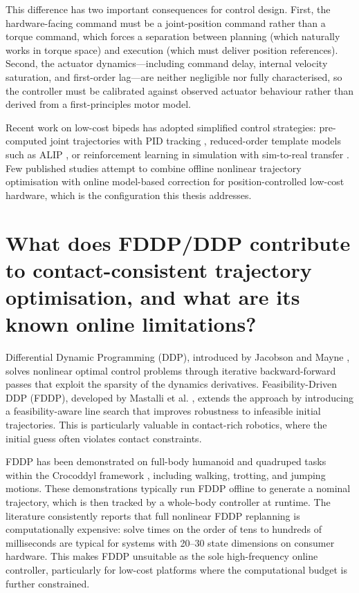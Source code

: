 \documentclass[12pt,a4paper]{report}
\begin{document}
This difference has two important consequences for control design. First, the hardware-facing command must be a joint-position command rather than a torque command, which forces a separation between planning (which naturally works in torque space) and execution (which must deliver position references). Second, the actuator dynamics---including command delay, internal velocity saturation, and first-order lag---are neither negligible nor fully characterised, so the controller must be calibrated against observed actuator behaviour rather than derived from a first-principles motor model.
 
Recent work on low-cost bipeds has adopted simplified control strategies: pre-computed joint trajectories with PID tracking \cite{kim2023_lowcost_biped}, reduced-order template models such as ALIP \cite{gibson2022_alip}, or reinforcement learning in simulation with sim-to-real transfer \cite{kumar2023_learning}. Few published studies attempt to combine offline nonlinear trajectory optimisation with online model-based correction for position-controlled low-cost hardware, which is the configuration this thesis addresses.
 
\section{What does FDDP/DDP contribute to contact-consistent trajectory optimisation, and what are its known online limitations?}
 
Differential Dynamic Programming (DDP), introduced by Jacobson and Mayne \cite{jacobson1970differential}, solves nonlinear optimal control problems through iterative backward-forward passes that exploit the sparsity of the dynamics derivatives. Feasibility-Driven DDP (FDDP), developed by Mastalli et al. \cite{mastalli2020crocoddyl}, extends the approach by introducing a feasibility-aware line search that improves robustness to infeasible initial trajectories. This is particularly valuable in contact-rich robotics, where the initial guess often violates contact constraints.
 
FDDP has been demonstrated on full-body humanoid and quadruped tasks within the Crocoddyl framework \cite{mastalli2020crocoddyl, carpentier2019pinocchio}, including walking, trotting, and jumping motions. These demonstrations typically run FDDP offline to generate a nominal trajectory, which is then tracked by a whole-body controller at runtime. The literature consistently reports that full nonlinear FDDP replanning is computationally expensive: solve times on the order of tens to hundreds of milliseconds are typical for systems with 20--30 state dimensions on consumer hardware. This makes FDDP unsuitable as the sole high-frequency online controller, particularly for low-cost platforms where the computational budget is further constrained.
 
\end{document}
